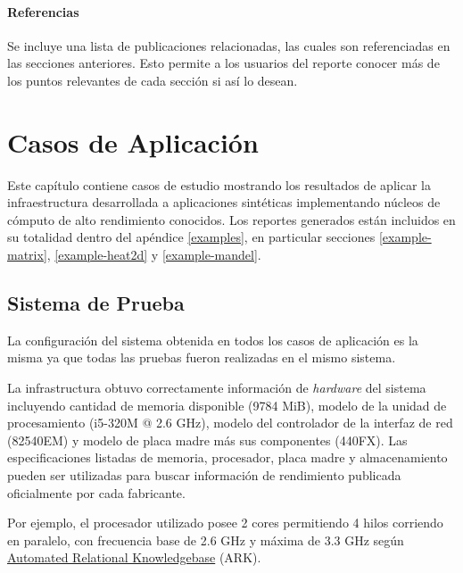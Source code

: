 \documentclass[a4paper]{report}
\begin{document}
\subsubsection{Referencias}

Se incluye una lista de publicaciones relacionadas, las cuales son referenciadas en las secciones anteriores.
Esto permite a los usuarios del reporte conocer más de los puntos relevantes de cada sección si así lo desean.

\chapter{Casos de Aplicación} \label{Casos de Aplicacion}

Este capítulo contiene casos de estudio mostrando los resultados de aplicar la infraestructura desarrollada a aplicaciones sintéticas implementando núcleos de cómputo de alto rendimiento conocidos. Los reportes generados están incluidos en su totalidad dentro del apéndice \ref{examples}, en particular secciones \ref{example-matrix}, \ref{example-heat2d} y \ref{example-mandel}.

\section{Sistema de Prueba}

La configuración del sistema obtenida en todos los casos de aplicación es la misma ya que todas las pruebas fueron realizadas en el mismo sistema.

\bigskip

La infrastructura obtuvo correctamente información de {\it hardware} del sistema incluyendo cantidad de memoria disponible (9784 MiB), modelo de la unidad de procesamiento (i5-320M @ 2.6 GHz), modelo del controlador de la interfaz de red (82540EM) y modelo de placa madre más sus componentes (440FX). Las especificaciones listadas de memoria, procesador, placa madre y almacenamiento pueden ser utilizadas para buscar información de rendimiento publicada oficialmente por cada fabricante.

\bigskip

Por ejemplo, el procesador utilizado posee 2 cores permitiendo 4 hilos corriendo en paralelo, con frecuencia base de 2.6 GHz y máxima de 3.3 GHz según \href{http://ark.intel.com/products/64896/Intel-Core-i5-3320M-Processor-3M-Cache-up-to-3\_30-GHz}{Automated Relational Knowledgebase} (ARK).

\bigskip
\end{document}
